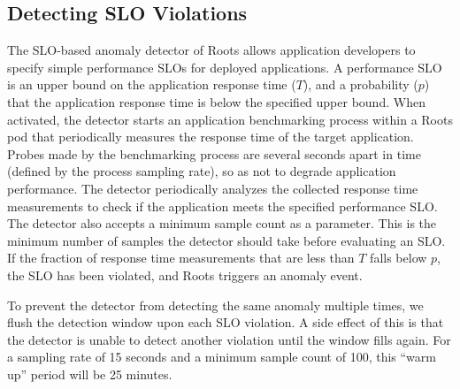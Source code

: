\subsection{Detecting SLO Violations}

The SLO-based anomaly detector of Roots
allows application developers to specify simple performance SLOs for deployed applications. A
performance SLO is an upper bound on the application response time ($T$), and a probability ($p$)
that the application response time is below the specified upper bound. 
When activated, the detector starts an application benchmarking process within a Roots pod
that periodically measures the response time of the target application. Probes made by the benchmarking 
process are several seconds apart in time (defined by the process sampling rate), 
so as not to degrade application performance.
The detector periodically
analyzes the collected response time measurements to check if the application meets the specified performance
SLO. The detector also accepts a minimum sample count as a parameter. This is the minimum number of 
samples the detector should take before evaluating an SLO.  If the fraction of response time measurements
that are
less than $T$ falls below $p$, the SLO has been violated, and Roots triggers an anomaly event.

To prevent the detector from detecting the same anomaly multiple times, we flush
the detection window upon each SLO violation. A side effect of this is that 
the detector is unable to detect
another violation until the window fills again.
For a sampling rate of 15 seconds and a minimum
sample count of 100, this ``warm up'' period will be 25 minutes.

